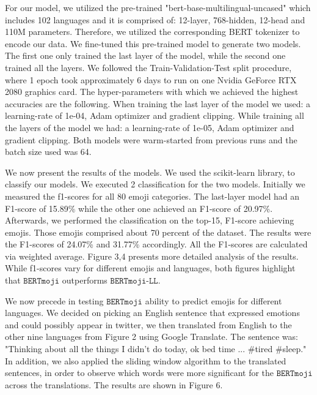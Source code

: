 \documentclass[11pt]{article}
\newcommand{\bertmoji}{\texttt{BERTmoji}}
\newcommand{\bertmojill}{\texttt{BERTmoji-LL}}
\begin{document}
For our model, we utilized the pre-trained "bert-base-multilingual-uncased" which includes 102 languages and it is comprised of: 12-layer, 768-hidden, 12-head and 110M parameters.
Therefore, we utilized the corresponding BERT tokenizer to encode our data.
We fine-tuned this pre-trained model to generate two models. 
The first one only trained the last layer of the model, while the second one trained all the layers.
We followed the Train-Validation-Test split procedure, where 1 epoch took approximately 6 days to run on one Nvidia GeForce RTX 2080 graphics card.
The hyper-parameters with which we achieved the highest accuracies are the following. 
When training the last layer of the model we used: a learning-rate of 1e-04, Adam optimizer and gradient clipping. 
While training all the layers of the model we had: a learning-rate of 1e-05, Adam optimizer and gradient clipping. 
Both models were warm-started from previous runs and the batch size used was 64.

We now present the results of the models. We used the scikit-learn \cite{} library, to classify our models.
We executed 2 classification for the two models. Initially we measured the f1-scores for all 80 emoji categories.
The last-layer model had an F1-score of 15.89\% while the other one achieved an F1-score of 20.97\%. 
Afterwards, we performed the classification on the top-15, F1-score achieving emojis. 
Those emojis comprised about 70 percent of the dataset.
The results were the F1-scores of 24.07\% and 31.77\% accordingly.
All the F1-scores are calculated via weighted average. Figure 3,4 presents more detailed analysis of the results.
While f1-scores vary for different emojis and languages,
both figures highlight that  $\bertmoji$ outperforms $\bertmojill$. 

We now precede in testing $\bertmoji$ ability to predict emojis for different languages.
We decided on picking an English sentence that expressed emotions and could possibly appear in twitter,
we then translated from English to the other nine languages from Figure 2 using Google Translate.
The sentence was: "Thinking about all the things I didn't do today, ok bed time ... \#tired \#sleep."
In addition, we also applied the sliding window algorithm to the translated sentences,
in order to observe which words were more significant for the $\bertmoji$ across the translations.
The results are shown in Figure 6. 
\end{document}
